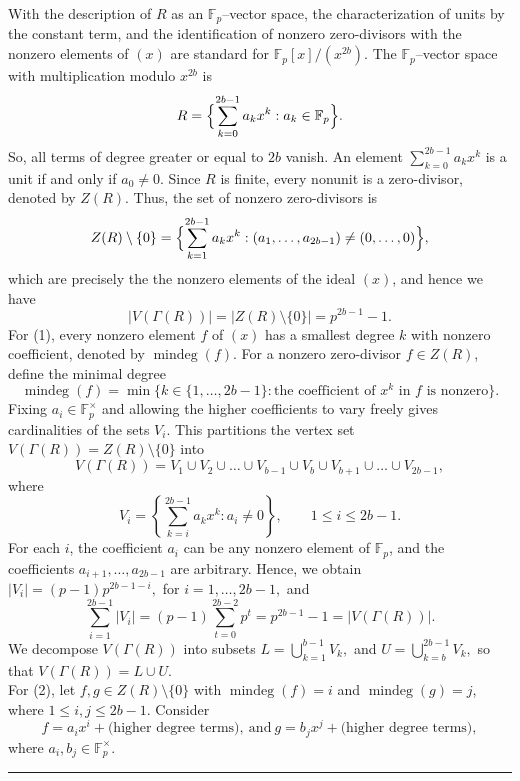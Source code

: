 \documentclass[12pt,twoside]{article}
\renewenvironment{proof}{{\noindent\bfseries Proof.}}{\qed}
\def\qed{\nolinebreak\hfill\rule{.2cm}{.2cm}\par\addvspace{.5cm}}
\begin{document}
	\begin{proof}
		With the description of $R$ as an $\mathbb{F}_p$--vector space, the characterization of
		units by the constant term, and the identification of nonzero zero-divisors with the
		nonzero elements of $(x)$ are standard for $\mathbb{F}_p[x]/(x^{2b})$. The $\mathbb{F}_p$--vector space with multiplication modulo $x^{2b}$ is
		\[
		R = \Bigl\{\sum_{k=0}^{2b-1} a_k x^k : a_k \in \mathbb{F}_p\Bigr\}.
		\]
		 So, all terms of degree greater or equal to $2b$ vanish. An element $\sum_{k=0}^{2b-1} a_k x^k$ is a unit if and only if $a_0\neq 0$.
		Since $R$ is finite, every nonunit is a zero-divisor, denoted by $Z(R)$. Thus, the set of nonzero zero-divisors is
		\[
		Z(R)\setminus\{0\}
		= \Bigl\{\sum_{k=1}^{2b-1} a_k x^k : (a_1,\dots,a_{2b-1}) \neq (0,\dots,0)\Bigr\},
		\]
		which are precisely the the nonzero elements of the ideal $(x)$, and hence we have
		\[
		|V( \varGamma(R))|
		= |Z(R)\setminus\{0\}|
		= p^{ 2b-1} - 1.
		\]
		For (1), every nonzero element $f$ of $(x)$ has a smallest degree $k$ with nonzero coefficient,
		denoted by $\operatorname{mindeg}(f)$. For a nonzero zero-divisor $f \in Z(R)$, define the minimal degree
		\[
		\operatorname{mindeg}(f)
		= \min\bigl\{k \in \{1,\dots,2b-1\} : \text{the coefficient of $x^k$ in $f$ is nonzero}\bigr\}.
		\]
		Fixing $a_i\in\mathbb{F}_p^\times$ and allowing the
		higher coefficients to vary freely gives cardinalities of the sets $V_i$.  This partitions the vertex set $V( \varGamma(R)) = Z(R)\setminus\{0\}$ into
		\[
		V( \varGamma(R)) = V_1 \cup V_2 \cup \dots\cup V_{b-1}\cup V_{b}\cup V_{b+1}\cup \dots \cup V_{2b-1},
		\]
		where
		\[
		V_i
		= \left\{
		\sum_{k=i}^{2b-1} a_k x^k : a_i \neq 0
		\right\}, \qquad 1\le i \le 2b-1.
		\]
		For each $i$, the coefficient $a_i$ can be any nonzero element of $\mathbb{F}_p$,
		and the coefficients $a_{i+1},\dots,a_{2b-1}$ are arbitrary.  Hence, we obtain $|V_i|= (p-1)p^{ 2b-1-i}, $ for $ i=1,\dots,2b-1,$
		and
		\[
		\sum_{i=1}^{2b-1} |V_i|
		= (p-1)\sum_{t=0}^{2b-2} p^t
		= p^{ 2b-1}-1
		= |V( \varGamma(R))|.
		\]
		We decompose $ V( \varGamma(R))$ into subsets $	L = \bigcup_{k=1}^{b-1} V_k,  $ and $
		U = \bigcup_{k=b}^{2b-1} V_k,$ so that $V( \varGamma(R))=L\cup U.$\\
		For (2), let $f,g\in Z(R)\setminus\{0\}$ with $\operatorname{mindeg}(f)=i$ and
		$\operatorname{mindeg}(g)=j$, where $1\le i,j\le 2b-1$. Consider 
		\[
		f = a_i x^i + \text{(higher degree terms)}, ~\text{and}~
		g = b_j x^j + \text{(higher degree terms)},
		\]
		where $a_i,b_j \in \mathbb{F}_p^\times$.

\end{proof}
\end{document}
